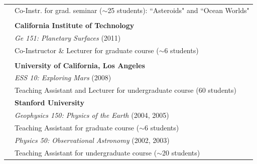\documentclass[letterpaper,10pt,twoside]{article}
\begin{document}
\begin{tabular}{@{} l l}
& \hspace{0.25in} Co-Instr. for grad. seminar ($\sim$25 students): ``Asteroids" and ``Ocean Worlds" \\
& \\
 \large{\textcolor{darkgray}{}} & \textbf{California Institute of Technology} \\
 & \textit{Ge 151: Planetary Surfaces} (2011) \\
 & \hspace{0.25in} Co-Instructor \& Lecturer for graduate course ($\sim$6 students) \\
 & \\
 & \textbf{University of California, Los Angeles} \\
 & \textit{ESS 10: Exploring Mars} (2008) \\
 & \hspace{0.25in} Teaching Assistant and Lecturer for undergraduate course (60 students) \\
 & \textbf{Stanford University} \\
 & \textit{Geophysics 150: Physics of the Earth} (2004, 2005) \\
 & \hspace{0.25in} Teaching Assistant for graduate course ($\sim$6 students) \\
 & \textit{Physics 50: Observational Astronomy} (2002, 2003) \\
 & \hspace{0.25in} Teaching Assistant for undergraduate course ($\sim$20 students) \\
\end{tabular}

\vspace{0.05in}
\end{document}
